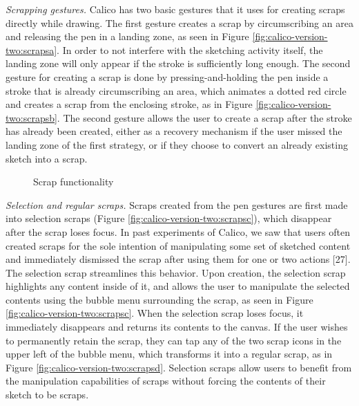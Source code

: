 \emph{Scrapping gestures.} Calico has two basic gestures that it uses for creating scraps directly while drawing. The first gesture creates a scrap by circumscribing an area and releasing the pen in a landing zone, as seen in Figure \ref{fig:calico-version-two:scrapsa}. In order to not interfere with the sketching activity itself, the landing zone will only appear if the stroke is sufficiently long enough. The second gesture for creating a scrap is done by pressing-and-holding the pen inside a stroke that is already circumscribing an area, which animates a dotted red circle and creates a scrap from the enclosing stroke, as in Figure \ref{fig:calico-version-two:scrapsb}. The second gesture allows the user to create a scrap after the stroke has already been created, either as a recovery mechanism if the user missed the landing zone of the first strategy, or if they choose to convert an already existing sketch into a scrap. 

\begin{figure}%
  \centering
   \caption {Scrap functionality}
   \label{fig:calico-version-two:scraps}
\end{figure}%

\emph{Selection and regular scraps.} Scraps created from the pen gestures are first made into selection scraps (Figure \ref{fig:calico-version-two:scrapsc}), which disappear after the scrap loses focus. In past experiments of Calico, we saw that users often created scraps for the sole intention of manipulating some set of sketched content and immediately dismissed the scrap after using them for one or two actions [27]. The selection scrap streamlines this behavior. Upon creation, the selection scrap highlights any content inside of it, and allows the user to manipulate the selected contents using the bubble menu surrounding the scrap, as seen in Figure \ref{fig:calico-version-two:scrapsc}. When the selection scrap loses focus, it immediately disappears and returns its contents to the canvas. If the user wishes to permanently retain the scrap, they can tap any of the two scrap icons in the upper left of the bubble menu, which transforms it into a regular scrap, as in Figure \ref{fig:calico-version-two:scrapsd}. Selection scraps allow users to benefit from the manipulation capabilities of scraps without forcing the contents of their sketch to be scraps.

